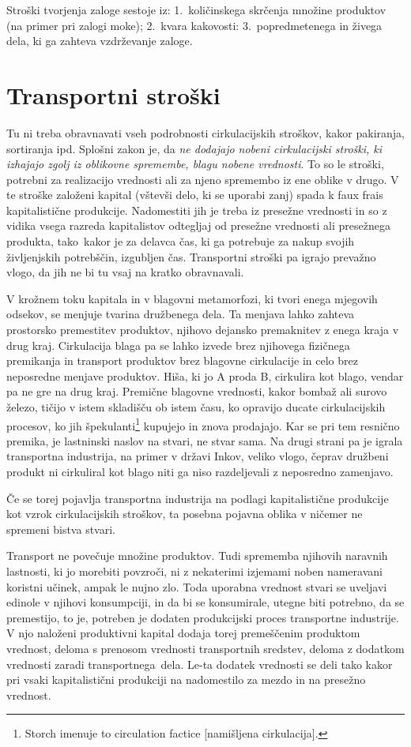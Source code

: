 \documentclass[kapital_02.tex]{subfiles}
\begin{document}
Stroški tvorjenja zaloge sestoje iz: 1.\ količinskega skrčenja množine produktov (na primer pri zalogi moke); 2.\ kvara kakovosti: 3.\ popredmetenega in živega dela, ki ga zahteva vzdrževanje zaloge.

\section{Transportni stroški}
Tu ni treba obravnavati vseh podrobnosti cirkulacijskih stroškov, kakor pakiranja, sortiranja ipd.
Splošni zakon je, da \emph{ne dodajajo nobeni cirkulacijski stroški, ki izhajajo zgolj iz oblikovne spremembe, blagu nobene vrednosti}.
To so le stroški, potrebni za realizacijo vrednosti ali za njeno spremembo iz ene oblike v drugo.
V te stroške založeni kapital (vštevši delo, ki se uporabi zanj) spada k faux frais kapitalistične produkcije.
Nadomestiti jih je treba iz presežne vrednosti in so z vidika vsega razreda kapitalistov odtegljaj od presežne vrednosti ali presežnega produkta, tako\KPEstran\ kakor je za delavca čas, ki ga potrebuje za nakup svojih življenjskih potrebščin, izgubljen čas.
Transportni stroški pa igrajo prevažno vlogo, da jih ne bi tu vsaj na kratko obravnavali.

V krožnem toku kapitala in v blagovni metamorfozi, ki tvori enega mjegovih odsekov, se menjuje tvarina družbenega dela. 
Ta menjava lahko zahteva prostorsko premestitev produktov, njihovo dejansko premaknitev z enega kraja v drug kraj. 
Cirkulacija blaga pa se lahko izvede brez njihovega fizičnega premikanja in transport produktov brez blagovne cirkulacije in celo brez neposredne menjave produktov.
Hiša, ki jo A proda B, cirkulira kot blago, vendar pa ne gre na drug kraj.
Premične blagovne vrednosti, kakor bombaž ali surovo železo, tičijo v istem skladišču ob istem času, ko opravijo ducate cirkulacijskih procesov, ko jih špekulanti\footnote
{Storch imenuje to circulation factice [namišljena cirkulacija].}
kupujejo in znova prodajajo.
Kar se pri tem resnično premika, je lastninski naslov na stvari, ne stvar sama.
Na drugi strani pa je igrala transportna industrija, na primer v državi Inkov, veliko vlogo, čeprav družbeni produkt ni cirkuliral kot blago niti ga niso razdeljevali z neposredno zamenjavo.

Če se torej pojavlja transportna industrija na podlagi kapitalistične produkcije kot vzrok cirkulacijskih stroškov, ta posebna pojavna oblika v ničemer ne spremeni bistva stvari.

Transport ne povečuje množine produktov. Tudi sprememba njihovih naravnih lastnosti, ki jo morebiti povzroči, ni z nekaterimi izjemami noben nameravani koristni učinek, ampak le nujno zlo.
Toda uporabna vrednost stvari se uveljavi edinole v njihovi konsumpciji, in da bi se konsumirale, utegne biti potrebno, da se premestijo, to je, potreben je dodaten produkcijski proces transportne industrije.
V njo naloženi produktivni kapital dodaja torej premeščenim produktom vrednost, deloma s prenosom vrednosti transportnih sredstev, deloma z dodatkom vrednosti zaradi transportnega\KPEstran\ dela.
Le-ta dodatek vrednosti se deli tako kakor pri vsaki kapitalistični produkciji na nadomestilo za mezdo in na presežno vrednost.
\end{document}
